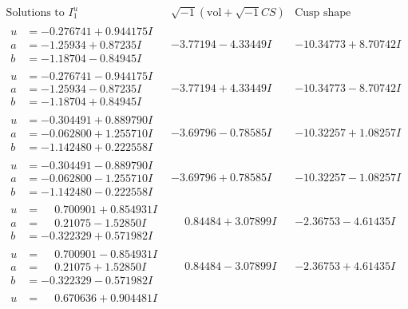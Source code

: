 \documentclass[1p]{elsarticle_modified}
\theoremstyle{definition}
\newcommand{\I}{\sqrt{-1}}
\begin{document}
$$\begin{array}{c|c|c}  
\text{Solutions to }I^u_{1}& \I (\text{vol} + \sqrt{-1}CS) & \text{Cusp shape}\\
 \hline 
\begin{aligned}
u &= -0.276741 + 0.944175 I \\
a &= -1.25934 + 0.87235 I \\
b &= -1.18704 - 0.84945 I\end{aligned}
 & -3.77194 - 4.33449 I & -10.34773 + 8.70742 I \\ \hline\begin{aligned}
u &= -0.276741 - 0.944175 I \\
a &= -1.25934 - 0.87235 I \\
b &= -1.18704 + 0.84945 I\end{aligned}
 & -3.77194 + 4.33449 I & -10.34773 - 8.70742 I \\ \hline\begin{aligned}
u &= -0.304491 + 0.889790 I \\
a &= -0.062800 + 1.255710 I \\
b &= -1.142480 + 0.222558 I\end{aligned}
 & -3.69796 - 0.78585 I & -10.32257 + 1.08257 I \\ \hline\begin{aligned}
u &= -0.304491 - 0.889790 I \\
a &= -0.062800 - 1.255710 I \\
b &= -1.142480 - 0.222558 I\end{aligned}
 & -3.69796 + 0.78585 I & -10.32257 - 1.08257 I \\ \hline\begin{aligned}
u &= \phantom{-}0.700901 + 0.854931 I \\
a &= \phantom{-}0.21075 - 1.52850 I \\
b &= -0.322329 + 0.571982 I\end{aligned}
 & \phantom{-}0.84484 + 3.07899 I & -2.36753 - 4.61435 I \\ \hline\begin{aligned}
u &= \phantom{-}0.700901 - 0.854931 I \\
a &= \phantom{-}0.21075 + 1.52850 I \\
b &= -0.322329 - 0.571982 I\end{aligned}
 & \phantom{-}0.84484 - 3.07899 I & -2.36753 + 4.61435 I \\ \hline\begin{aligned}
u &= \phantom{-}0.670636 + 0.904481 I \\

\end{aligned}
\end{array}$$
\end{document}
